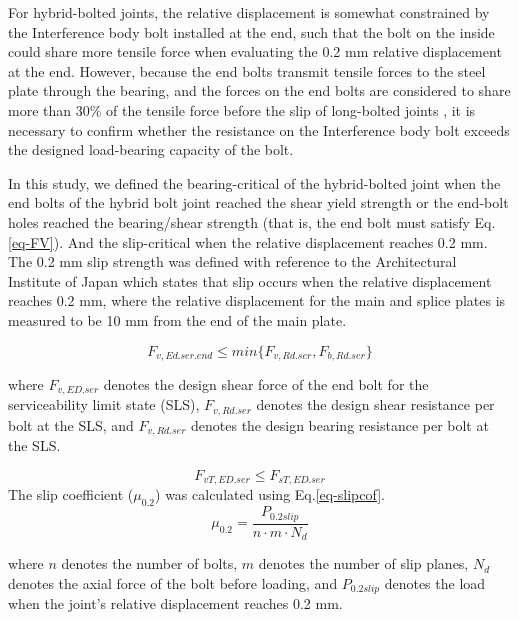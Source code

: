 For hybrid-bolted joints, the relative displacement is somewhat constrained by the Interference body bolt installed at the end, such that the bolt on the inside could share more tensile force when evaluating the 0.2 mm relative displacement at the end. However, because the end bolts transmit tensile forces to the steel plate through the bearing, and the forces on the end bolts are considered to share more than 30\% of the tensile force before the slip of long-bolted joints \cite{Zhanghuazhi2000,chinarailway2005}, it is necessary to confirm whether the resistance on the Interference body bolt exceeds the designed load-bearing capacity of the bolt. 

In this study, we defined the bearing-critical of the hybrid-bolted joint when the end bolts of the hybrid bolt joint reached the shear yield strength or the end-bolt holes reached the bearing/shear strength (that is, the end bolt must satisfy Eq.\ref{eq-FV}). And the slip-critical when the relative displacement reaches 0.2 mm. The 0.2 mm slip strength was defined with reference to the Architectural Institute of Japan \cite{AIJ2012AIJStructures} which states that slip occurs when the relative displacement reaches 0.2 mm, where the relative displacement for the main and splice plates is measured to be 10 mm from the end of the main plate. 

\begin{equation}
    F_{v,Ed.ser.end} \leq min\{F_{v,Rd.ser}, F_{b,Rd.ser}\}
    \label{eq-FV}
\end{equation}

where $F_{v,ED.ser}$ denotes the design shear force of the end bolt for the serviceability limit state (SLS), $F_{v,Rd.ser}$ denotes the design shear resistance per bolt at the SLS, and $F_{v,Rd.ser}$ denotes the design bearing resistance per bolt at the SLS.

\begin{equation}
    F_{vT,ED.ser} \leq F_{sT,ED.ser}
\end{equation}
The slip coefficient ($\mu_{0.2}$) was calculated using Eq.\ref{eq-slipcof}.
\begin{equation}
    \mu_{0.2} = \frac{P_{0.2slip}}{n \cdot m \cdot N_d}
    \label{eq-slipcof}
\end{equation}

where $n$ denotes the number of bolts, $m$ denotes the number of slip planes, $N_d$ denotes the axial force of the bolt before loading, and $P_{0.2slip}$ denotes the load when the joint's relative displacement reaches 0.2 mm.


